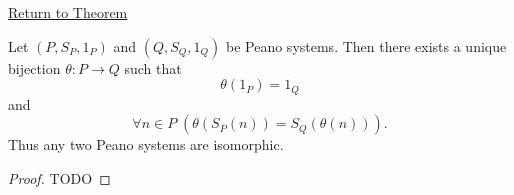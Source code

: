 \newpage
{}
\label{prf:uniqueness-of-peano-systems-up-to-isomorphism}

\begin{remark*}[Return]
\hyperref[thm:uniqueness-of-peano-systems-up-to-isomorphism]{Return to Theorem}
\end{remark*}

\begin{theorem*}
Let $(P,S_P,1_P)$ and $(Q,S_Q,1_Q)$ be Peano systems. Then there exists a
unique bijection $\theta:P\to Q$ such that
\[
\theta(1_P)=1_Q
\]
and
\[
\forall n\in P\;(\theta(S_P(n))=S_Q(\theta(n))).
\]
Thus any two Peano systems are isomorphic.
\end{theorem*}

\begin{proof}
TODO
\end{proof}

